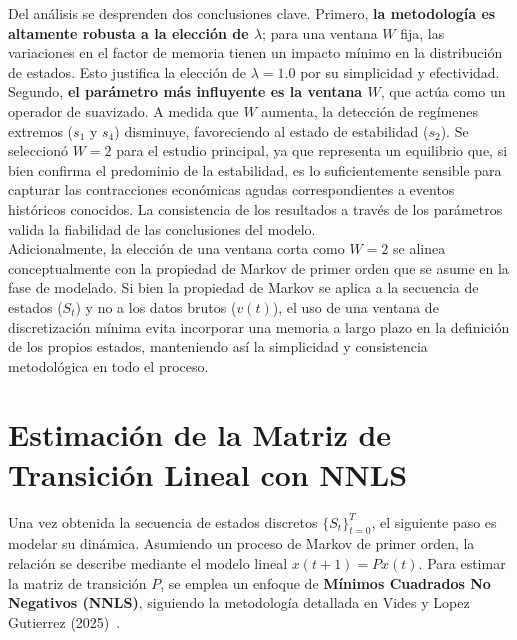 Del análisis se desprenden dos conclusiones clave. Primero, \textbf{la metodología es altamente robusta a la elección de $\lambda$}; para una ventana $W$ fija, las variaciones en el factor de memoria tienen un impacto mínimo en la distribución de estados. Esto justifica la elección de $\lambda=1.0$ por su simplicidad y efectividad.\\

Segundo, \textbf{el parámetro más influyente es la ventana $W$}, que actúa como un operador de suavizado. A medida que $W$ aumenta, la detección de regímenes extremos ($s_1$ y $s_4$) disminuye, favoreciendo al estado de estabilidad ($s_2$). Se seleccionó $W=2$ para el estudio principal, ya que representa un equilibrio que, si bien confirma el predominio de la estabilidad, es lo suficientemente sensible para capturar las contracciones económicas agudas correspondientes a eventos históricos conocidos. La consistencia de los resultados a través de los parámetros valida la fiabilidad de las conclusiones del modelo.\\



Adicionalmente, la elección de una ventana corta como $W=2$ se alinea conceptualmente con la propiedad de Markov de primer orden que se asume en la fase de modelado. Si bien la propiedad de Markov se aplica a la secuencia de estados ($S_t$) y no a los datos brutos ($v(t)$), el uso de una ventana de discretización mínima evita incorporar una memoria a largo plazo en la definición de los propios estados, manteniendo así la simplicidad y consistencia metodológica en todo el proceso.

\section{Estimación de la Matriz de Transición Lineal con NNLS}
\label{sec:estimacion_nnls}


Una vez obtenida la secuencia de estados discretos $\{S_t\}_{t=0}^{T}$, el siguiente paso es modelar su dinámica. Asumiendo un proceso de Markov de primer orden, la relación se describe mediante el modelo lineal $x(t+1) = Px(t)$. Para estimar la matriz de transición $P$, se emplea un enfoque de \textbf{Mínimos Cuadrados No Negativos (NNLS)}, siguiendo la metodología detallada en Vides y Lopez Gutierrez (2025)~\cite{vides_lopez_srep_2025}.

